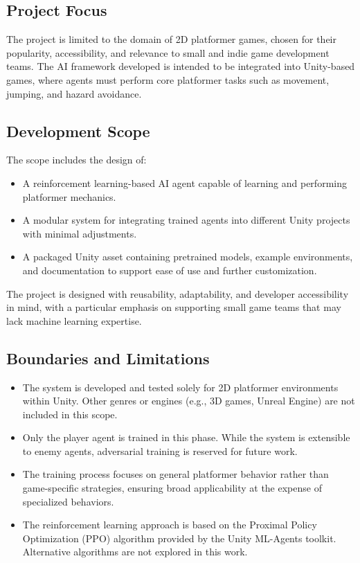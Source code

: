 \documentclass[12pt,oneside,openright,a4paper]{cpe-english-project}
\begin{document}
\subsection{Project Focus}

The project is limited to the domain of 2D platformer games, chosen for their popularity, accessibility, and relevance to small and indie game development teams. The AI framework developed is intended to be integrated into Unity-based games, where agents must perform core platformer tasks such as movement, jumping, and hazard avoidance.

\subsection{Development Scope}

The scope includes the design of:
\begin{itemize}
\item A reinforcement learning-based AI agent capable of learning and performing platformer mechanics.
\item A modular system for integrating trained agents into different Unity projects with minimal adjustments.
\item A packaged Unity asset containing pretrained models, example environments, and documentation to support ease of use and further customization.
\end{itemize}

The project is designed with reusability, adaptability, and developer accessibility in mind, with a particular emphasis on supporting small game teams that may lack machine learning expertise.

\subsection{Boundaries and Limitations}

\begin{itemize}
\item The system is developed and tested solely for 2D platformer environments within Unity. Other genres or engines (e.g., 3D games, Unreal Engine) are not included in this scope.
\item Only the player agent is trained in this phase. While the system is extensible to enemy agents, adversarial training is reserved for future work.
\item The training process focuses on general platformer behavior rather than game-specific strategies, ensuring broad applicability at the expense of specialized behaviors.
\item The reinforcement learning approach is based on the Proximal Policy Optimization (PPO) algorithm provided by the Unity ML-Agents toolkit. Alternative algorithms are not explored in this work.
\end{itemize}
\end{document}
